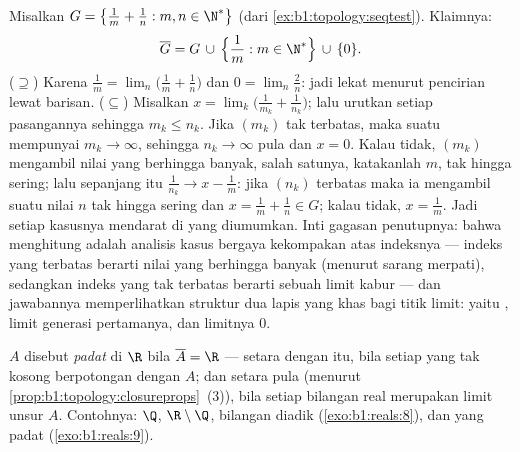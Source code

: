 \begin{example}\label{ex:b1:topology:closurecomputed}
Misalkan $G = \bigl\{\frac1m + \frac1n : m, n \in \N^*\bigr\}$ (dari
\cref{ex:b1:topology:seqtest}). Klaimnya:
\[
\overline G = G \,\cup\, \Bigl\{\frac1m : m \in \N^*\Bigr\}
\,\cup\, \{0\} .
\]
($\supseteq$) Karena $\frac1m = \lim_n \bigl(\frac1m + \frac1n\bigr)$
dan $0 = \lim_n \frac2n$: jadi lekat menurut pencirian lewat
barisan. ($\subseteq$) Misalkan $x = \lim_k \bigl(
\frac{1}{m_k} + \frac{1}{n_k}\bigr)$; lalu urutkan setiap pasangannya sehingga
$m_k \leq n_k$. Jika $(m_k)$ tak terbatas, maka suatu  mempunyai $m_k
\to \infty$, sehingga $n_k \to \infty$ pula dan $x = 0$. Kalau tidak,
$(m_k)$ mengambil nilai yang berhingga banyak, salah satunya, katakanlah $m$,
tak hingga sering; lalu sepanjang  itu $\frac{1}{n_k} \to x -
\frac1m$: jika $(n_k)$ terbatas maka ia mengambil suatu nilai $n$
tak hingga sering dan $x = \frac1m + \frac1n \in G$; kalau tidak, $x =
\frac1m$. Jadi setiap kasusnya mendarat di  yang diumumkan. Inti gagasan
penutupnya: bahwa menghitung  adalah analisis kasus bergaya kekompakan
atas indeksnya --- indeks yang terbatas berarti nilai yang berhingga
banyak (menurut sarang merpati), sedangkan indeks yang tak terbatas berarti sebuah limit kabur ---
dan jawabannya memperlihatkan struktur dua lapis yang khas bagi
titik limit: yaitu , limit generasi pertamanya, dan
limitnya $0$.
\end{example}

\begin{definition}\label{def:b1:topology:dense}
 $A$ disebut \emph{padat} di $\R$ bila $\overline A = \R$
--- setara dengan itu, bila setiap   yang tak kosong berpotongan dengan $A$;
dan setara pula (menurut \cref{prop:b1:topology:closureprops}~(3)), bila setiap
bilangan real merupakan limit unsur $A$. Contohnya: $\Q$, $\R \setminus
\Q$, bilangan diadik (\cref{exo:b1:reals:8}), dan  yang padat
(\cref{exo:b1:reals:9}).
\end{definition}

